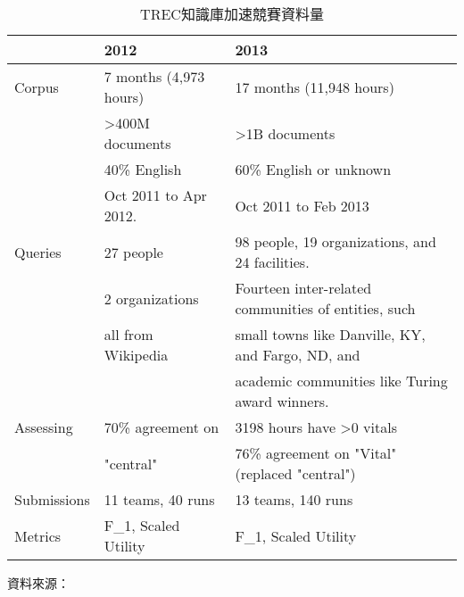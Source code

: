 \begin{table}
    \centering
    \footnotesize
    \begin{tabular}{|l|l|l|}
        \hline
            & 2012 & 2013 \\ \hline
        Corpus & 7 months (4,973 hours) & 17 months (11,948 hours)\\
            & >400M documents & >1B documents\\
            & 40\% English & 60\% English or unknown\\
        & Oct 2011 to Apr 2012. & Oct 2011 to Feb 2013\\
        \hline
        Queries & 27 people & 98 people, 19 organizations, and 24 facilities. \\
                & 2 organizations & Fourteen inter-related communities of entities, such \\
                & all from Wikipedia & small towns like Danville, KY, and Fargo, ND, and \\
        & & academic communities like Turing award winners. \\
        Assessing & 70\% agreement on & 3198 hours have >0 vitals \\
        & "central" & 76\% agreement on "Vital" (replaced "central") \\
        \hline
        Submissions & 11 teams, 40 runs & 13 teams, 140 runs \\
        \hline
        Metrics & F\_1, Scaled Utility & F\_1, Scaled Utility \\
        \hline
    \end{tabular}
    \caption{TREC知識庫加速競賽資料量}
    \label{t:kba-corps}
    \normalsize
    資料來源：\cite{kba2013}
\end{table}
